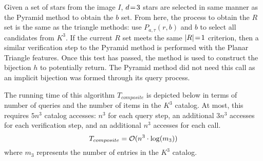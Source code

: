 Given a set of stars from the image $I$, $d \!=\! 3$ stars are selected in same manner as the Pyramid method to obtain
the $b$ set.
From here, the process to obtain the $R$ set is the same as the triangle methods: use $P_{a, \tau}(r, b)$ and $b$ to
select all candidates from $K^3$.
If the current $R$ set meets the same $\left| R \right| \!=\! 1$ criterion, then a similar verification step to the Pyramid method
is performed with the Planar Triangle features.
Once this test has passed, the  method is used to construct the bijection $h$ to potentially return.
The Pyramid method did not need this call as an implicit bijection was formed through its query process.

The running time of this algorithm $T_{composite}$ is depicted below in terms of number of queries and the number of
items in the $K^3$ catalog.
At most, this requires $5n^3$ catalog accesses: $n^3$ for each query step, an additional $3n^3$ accesses for each
verification step, and an additional $n^3$ accesses for each  call.
\begin{equation}
    T_{composite} = \mathcal{O} (n^3 \cdot \log(m_3))
\end{equation}
where $m_3$ represents the number of entries in the $K^3$ catalog.


%    
